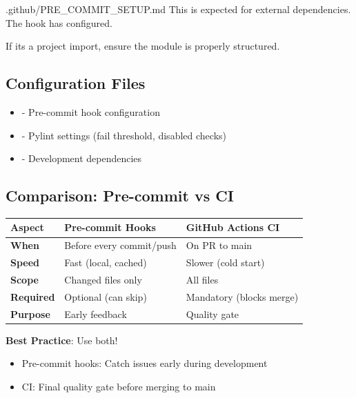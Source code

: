 \begin{relocated}{.github/PRE_COMMIT_SETUP.md}
This is expected for external dependencies. The hook has
 configured.

If it\textquotesingle s a project import, ensure the module is properly
structured.

\subsection{Configuration Files}\label{um:flow:pre-commit-setup:configuration-files}

\begin{itemize}
\tightlist
\item
   - Pre-commit hook configuration
\item
   - Pylint settings (fail threshold, disabled checks)
\item
   - Development dependencies
\end{itemize}

\subsection{Comparison: Pre-commit vs CI}\label{um:flow:pre-commit-setup:comparison-pre-commit-vs-ci}

{
\begin{longtable}[]{@{}lll@{}}
\toprule\noalign{}
Aspect & Pre-commit Hooks & GitHub Actions CI \\
\midrule\noalign{}
\endhead
\bottomrule\noalign{}
\endlastfoot
\textbf{When} & Before every commit/\allowbreak{}push & On PR to main \\
\textbf{Speed} & Fast (local, cached) & Slower (cold start) \\
\textbf{Scope} & Changed files only & All files \\
\textbf{Required} & Optional (can skip) & Mandatory (blocks merge) \\
\textbf{Purpose} & Early feedback & Quality gate \\
\end{longtable}
}

\textbf{Best Practice}: Use both!

\begin{itemize}
\tightlist
\item
  Pre-commit hooks: Catch issues early during development
\item
  CI: Final quality gate before merging to main
\end{itemize}


\end{relocated}
